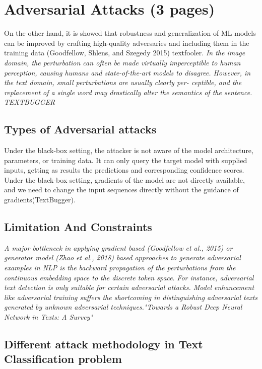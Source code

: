 \documentclass[%
	BCOR=8mm, %
	DIV=12, 
	toc=bibliography, %
	toc=listof, %
	oneside, %
	egregdoesnotlikesansseriftitles, %
	]{scrbook}
\begin{document}
\section{Adversarial Attacks (3 pages)}
On the other hand, it is showed that robustness and generalization of ML models can be improved by crafting high-quality adversaries and including them in the training data 
(Goodfellow, Shlens, and Szegedy 2015) textfooler. \textit{In the image domain, the perturbation can often be made virtually imperceptible to human perception, causing humans 
and state-of-the-art models to disagree. However, in the text domain, small perturbations are usually clearly per- ceptible, and the replacement of a single word may drastically alter 
the semantics of the sentence. TEXTBUGGER }

\subsection{Types of Adversarial attacks}
Under the black-box setting, the attacker is not aware of the model architecture, parameters, or training data. It can only query the target model with supplied inputs, getting as 
results the predictions and corresponding confidence scores. Under the black-box setting, gradients of the model are not directly available, and we need to change the input sequences
 directly without the guidance of gradients(TextBugger). 

\subsection{Limitation And Constraints}
\textit{A major bottleneck in applying gradient based (Goodfellow et al., 2015) or generator model (Zhao et al., 2018) based approaches to generate adversarial examples in NLP is
 the backward propagation of the perturbations from the continuous embedding space to the discrete token space}.\cite{garg_bae_2020} \textit{For instance, adversarial text detection 
 is only suitable for certain adversarial attacks. Model enhancement like adversarial training suffers the shortcoming in distinguishing adversarial texts generated by unknown adversarial 
 techniques."Towards a Robust Deep Neural Network in Texts: A Survey\(\)"} 
 
 
\subsection{Different attack methodology in Text Classification problem}
\end{document}
